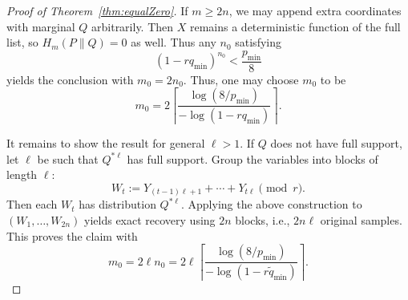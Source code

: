 \documentclass[journal]{IEEEtran}
\newcommand{\1}{\mathbf{1}}
\begin{document}
\begin{proof}[Proof of Theorem~\ref{thm:equalZero}]
If $m\ge 2n$, we may append extra coordinates with marginal $Q$ arbitrarily. Then $X$ remains a deterministic function of the full list, so $H_m(P\|Q)=0$ as well.
Thus any $n_0$ satisfying
\[
(1-rq_{\min})^{n_0}<\frac{p_{\min}}{8}
\]
yields the conclusion with $m_0=2n_0$. Thus, one may choose $m_0$ to be 
\[m_0=2\left\lceil
\frac{\log(8/p_{\min})}{-\log(1-rq_{\min})}
\right\rceil. %
\]

It remains to show the result for general $\ell > 1$. If $Q$ does not have full support, let $\ell$ be such that $Q^{*\ell}$ has full support.
Group the variables into blocks of length $\ell$:
\[
W_t := Y_{(t-1)\ell+1}+\cdots+Y_{t\ell}\pmod r.
\]
Then each $W_t$ has distribution $Q^{*\ell}$.
Applying the above construction to $(W_1,\dots,W_{2n})$ yields exact recovery using $2n$ blocks, i.e., $2n\ell$ original samples.
This proves the claim with
\[
m_0 = 2\ell n_0
=
2\ell \left\lceil
\frac{\log(8/p_{\min})}{-\log(1-r\widetilde q_{\min})}
\right\rceil.
\]
\end{proof}

\end{document}
